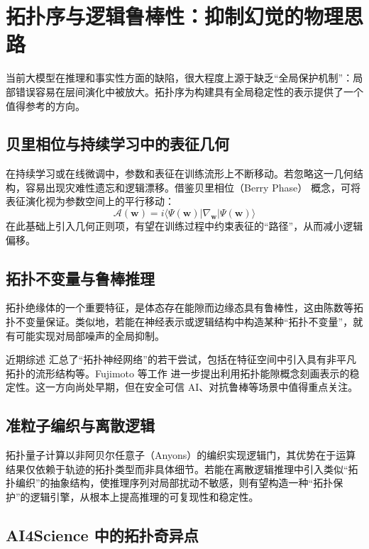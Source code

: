 \documentclass[12pt,a4paper]{article}
\begin{document}
\section{拓扑序与逻辑鲁棒性：抑制幻觉的物理思路}

当前大模型在推理和事实性方面的缺陷，很大程度上源于缺乏“全局保护机制”：局部错误容易在层间演化中被放大。拓扑序为构建具有全局稳定性的表示提供了一个值得参考的方向。

\subsection{贝里相位与持续学习中的表征几何}

在持续学习或在线微调中，参数和表征在训练流形上不断移动。若忽略这一几何结构，容易出现灾难性遗忘和逻辑漂移。借鉴贝里相位（Berry Phase）\cite{berry1984quantal} 概念，可将表征演化视为参数空间上的平行移动：
\begin{equation}
    \boldsymbol{\mathcal{A}}(\mathbf{w}) = i \langle \Psi(\mathbf{w}) | \nabla_{\mathbf{w}} | \Psi(\mathbf{w}) \rangle
\end{equation}
在此基础上引入几何正则项，有望在训练过程中约束表征的“路径”，从而减小逻辑偏移。

\subsection{拓扑不变量与鲁棒推理}

拓扑绝缘体的一个重要特征，是体态存在能隙而边缘态具有鲁棒性，这由陈数等拓扑不变量保证。类似地，若能在神经表示或逻辑结构中构造某种“拓扑不变量”，就有可能实现对局部噪声的全局抑制。

近期综述\cite{battiloro2024topological} 汇总了“拓扑神经网络”的若干尝试，包括在特征空间中引入具有非平凡拓扑的流形结构等。Fujimoto 等工作\cite{fujimoto2024topological} 进一步提出利用拓扑能隙概念刻画表示的稳定性。这一方向尚处早期，但在安全可信 AI、对抗鲁棒等场景中值得重点关注。

\subsection{准粒子编织与离散逻辑}

拓扑量子计算以非阿贝尔任意子（Anyons）的编织实现逻辑门，其优势在于运算结果仅依赖于轨迹的拓扑类型而非具体细节。若能在离散逻辑推理中引入类似“拓扑编织”的抽象结构，使推理序列对局部扰动不敏感，则有望构造一种“拓扑保护”的逻辑引擎，从根本上提高推理的可复现性和稳定性。

\subsection{AI4Science 中的拓扑奇异点}
\end{document}
